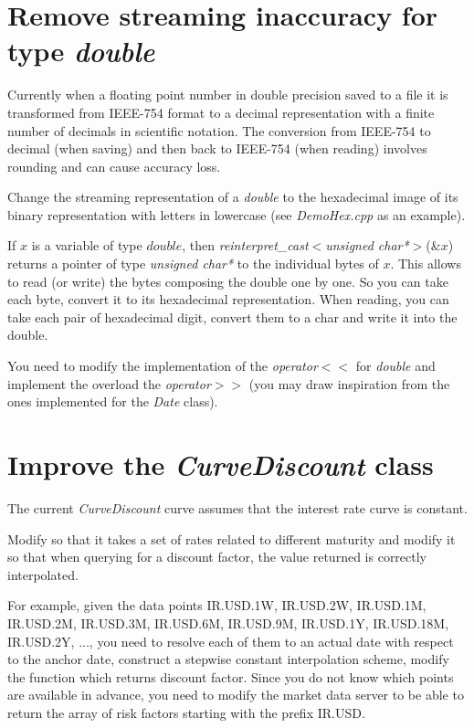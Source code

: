 \documentclass[10pt]{article}
\begin{document}
\section{Remove streaming inaccuracy for type \textit{double}}
Currently when a floating point number in double precision saved to a file it is transformed from IEEE-754 format to a decimal representation with a finite number of decimals in scientific notation. The conversion from IEEE-754 to decimal (when saving) and then back to IEEE-754 (when reading) involves rounding and can cause accuracy loss.

Change the streaming representation of a \textit{double} to the hexadecimal image of its binary representation with letters in lowercase (see \textit{DemoHex.cpp} as an example).

If $x$ is a variable of type $double$, then \textit{reinterpret\_cast$<$unsigned char*$>$}(\&$x$) returns a pointer of type \textit{unsigned char*} to the individual bytes of $x$. This allows to read (or write) the bytes composing the double one by one. So you can take each byte, convert it to its hexadecimal representation. When reading, you can take each pair of hexadecimal digit, convert them to a char and write it into the double.

You need to modify the implementation of the \textit{operator$<<$} for \textit{double} and implement the overload the \textit{operator$>>$} (you may draw inspiration from the ones implemented for the \textit{Date} class).

\section{Improve the \textit{CurveDiscount} class}
The current \textit{CurveDiscount} curve assumes that the interest rate curve is constant.

Modify so that it takes a set of rates related to different maturity and modify it so that when querying for a discount factor, the value returned is correctly interpolated.

For example, given the data points {IR.USD.1W, IR.USD.2W, IR.USD.1M, IR.USD.2M, IR.USD.3M, IR.USD.6M, IR.USD.9M, IR.USD.1Y, IR.USD.18M, IR.USD.2Y, ...}, you need to resolve each of them to an actual date with respect to the anchor date, construct a stepwise constant interpolation scheme, modify the function which returns discount factor. Since you do not know which points are available in advance, you need to modify the market data server to be able to return the array of risk factors starting with the prefix IR.USD.
\end{document}

